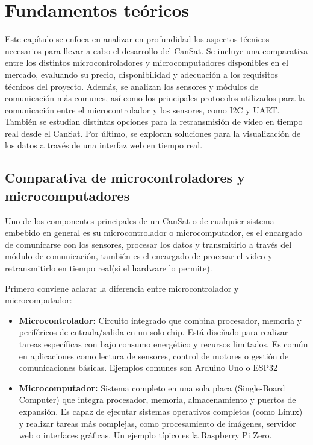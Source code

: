 \chapter{Fundamentos teóricos}
\label{cap:fundamentos_teoricos}
Este capítulo se enfoca en analizar en profundidad los aspectos técnicos necesarios para llevar a cabo el desarrollo del CanSat.
Se incluye una comparativa entre los distintos microcontroladores y microcomputadores disponibles en el mercado, evaluando su precio, disponibilidad y adecuación a los requisitos técnicos del proyecto.
Además, se analizan los sensores y módulos de comunicación más comunes, así como los principales protocolos utilizados para la comunicación entre el microcontrolador y los sensores, como I2C y UART.
También se estudian distintas opciones para la retransmisión de vídeo en tiempo real desde el CanSat.
Por último, se exploran soluciones para la visualización de los datos a través de una interfaz web en tiempo real.


\section{Comparativa de microcontroladores y microcomputadores}
Uno de los componentes principales de un CanSat o de cualquier sistema embebido en general es su microcontrolador o microcomputador,
es el encargado de comunicarse con los sensores, procesar los datos y transmitirlo a través del módulo de comunicación,
también es el encargado de procesar el video y retransmitirlo en tiempo real(si el hardware lo permite).

Primero conviene aclarar la diferencia entre microcontrolador y microcomputador:
\begin{itemize}
    \item \textbf{Microcontrolador:} Circuito integrado que combina procesador, memoria y periféricos de entrada/salida en un solo chip.
    Está diseñado para realizar tareas específicas con bajo consumo energético y recursos limitados.
    Es común en aplicaciones como lectura de sensores, control de motores o gestión de comunicaciones básicas.
    Ejemplos comunes son Arduino Uno o ESP32
    \item \textbf{Microcomputador:} Sistema completo en una sola placa (Single-Board Computer) que integra procesador, memoria, almacenamiento y puertos de expansión.
    Es capaz de ejecutar sistemas operativos completos (como Linux) y realizar tareas más complejas, como procesamiento de imágenes, servidor web o interfaces gráficas.
    Un ejemplo típico es la Raspberry Pi Zero.
\end{itemize}

